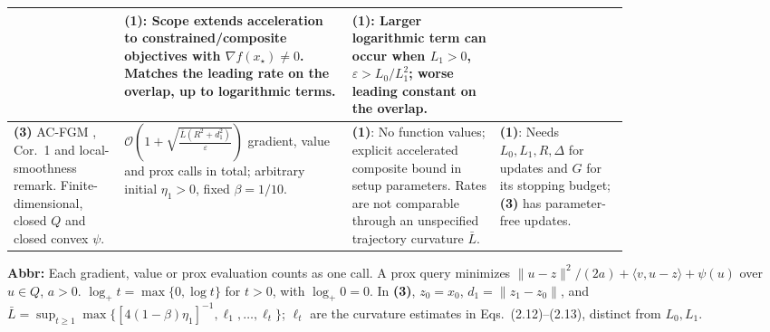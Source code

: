 \begin{table}[tp]
\begin{threeparttable}
\begin{tabularx}{\linewidth}{@{}>{\raggedright\arraybackslash}p{0.18\linewidth}>{\raggedright\arraybackslash}p{0.37\linewidth}>{\raggedright\arraybackslash}p{0.24\linewidth}>{\raggedright\arraybackslash}X@{}}
& \textbf{(1)}: Scope extends acceleration to constrained/composite objectives with $\nabla f(x_\star)\ne0$. Matches the leading rate on the overlap, up to logarithmic terms.
& \textbf{(1)}: Larger logarithmic term can occur when $L_1>0$, $\varepsilon>L_0/L_1^2$; worse leading constant on the overlap. \\
\midrule
\textbf{(3)} AC-FGM \citep{cgsLiLan2024v3}, Cor.~1 and local-smoothness remark. Finite-dimensional, closed $Q$ and closed convex $\psi$.
& $\displaystyle\mathcal{O}\!\left(1+\sqrt{\frac{\bar L(R^2+d_1^2)}{\varepsilon}}\right)$ gradient, value and prox calls in total; arbitrary initial $\eta_1>0$, fixed $\beta=1/10$.
& \textbf{(1)}: No function values; explicit accelerated composite bound in setup parameters. Rates are not comparable through an unspecified trajectory curvature $\bar L$.
& \textbf{(1)}: Needs $L_0,L_1,R,\Delta$ for updates and $G$ for its stopping budget; \textbf{(3)} has parameter-free updates. \\
\bottomrule
\end{tabularx}
\begin{tablenotes}[flushleft]\footnotesize
\item[] \textbf{Abbr:} Each gradient, value or prox evaluation counts as one call. A prox query minimizes $\|u-z\|^2/(2a)+\langle v,u-z\rangle+\psi(u)$ over $u\in Q$, $a>0$. $\log_+t=\max\{0,\log t\}$ for $t>0$, with $\log_+0=0$. In \textbf{(3)}, $z_0=x_0$, $d_1=\|z_1-z_0\|$, and $\bar L=\sup_{t\ge1}\max\{[4(1-\beta)\eta_1]^{-1},\ell_1,\ldots,\ell_t\}$; $\ell_t$ are the curvature estimates in Eqs.~(2.12)--(2.13), distinct from $L_0,L_1$.
\end{tablenotes}
\end{threeparttable}
\end{table}
\clearpage
